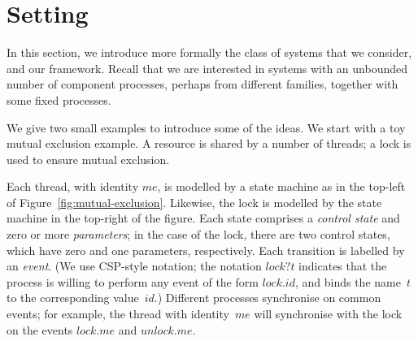 \def\Node{Nd}
\def\Lock{Lk}
\def\Head{Hd}
\def\Last{Lt}
\def\Con{C}
\def\InitNode{InitNd}

\section{Setting}
\label{sec:setting}

In this section, we introduce more formally the class of systems that we
consider, and our framework.  Recall that we are interested in systems with an
unbounded number of component processes, perhaps from different families,
together with some fixed processes.

We give two small examples to introduce some of the ideas.  We start with a
toy mutual exclusion example.  A resource is shared by a number of threads; a
lock is used to ensure mutual exclusion.

Each thread, with identity $me$, is modelled by a state machine as in the
top-left of Figure~\ref{fig:mutual-exclusion}.  Likewise, the lock is modelled
by the state machine in the top-right of the figure. 
%
Each state comprises a \emph{control state} and zero or
more \emph{parameters}; in the case of the lock, there are two control states,
which have zero and one parameters, respectively.  Each transition is labelled
by an \emph{event}. (We use CSP-style notation; the notation $lock?t$
indicates that the process is willing to perform any event of the form
$lock.id$, and binds the name~$t$ to the corresponding value~$id$.)  Different
processes synchronise on common events; for example, the thread with
identity~$me$ will synchronise with the lock on the events $lock.me$ and
$unlock.me$.   



